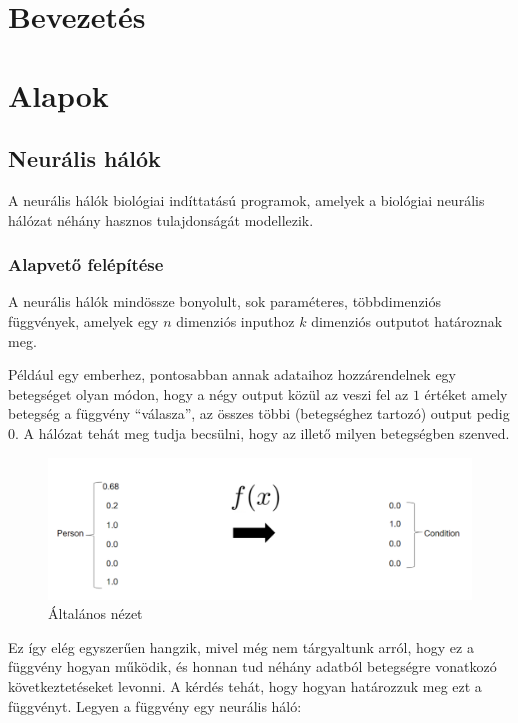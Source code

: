 \documentclass[12pt]{article}
\begin{document}
\section{Bevezetés}


\section{Alapok}

\subsection{Neurális hálók}

A neurális hálók biológiai indíttatású programok, amelyek a biológiai neurális hálózat néhány hasznos tulajdonságát modellezik.

\subsubsection{Alapvető felépítése}

A neurális hálók mindössze bonyolult, sok paraméteres, többdimenziós függvények, amelyek egy $n$ dimenziós inputhoz $k$ dimenziós outputot határoznak meg.

Például egy emberhez, pontosabban annak adataihoz hozzárendelnek egy betegséget olyan módon, hogy a négy output közül az veszi fel az $1$ értéket amely betegség a függvény “válasza”, az összes többi (betegséghez tartozó) output pedig $0$. A hálózat tehát meg tudja becsülni, hogy az illető milyen betegségben szenved.

\begin{figure}[h!]
  \includegraphics[width=\linewidth]{fgv.png}
  \caption{Általános nézet}
\end{figure}

Ez így elég egyszerűen hangzik, mivel még nem tárgyaltunk arról, hogy ez a függvény hogyan működik, és honnan tud néhány adatból betegségre vonatkozó következtetéseket levonni. A kérdés tehát, hogy hogyan határozzuk meg ezt a függvényt. Legyen a függvény egy neurális háló:
\end{document}
